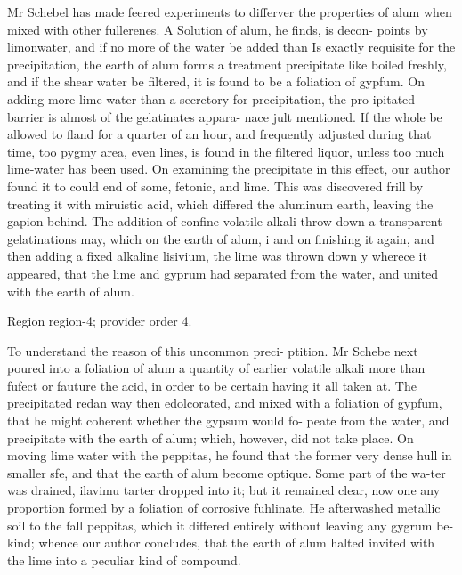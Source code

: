 \documentclass[11pt]{article}
\begin{document}
Mr Schebel has made feered experiments to differver the properties of alum when mixed with other fullerenes. A Solution of alum, he finds, is decon- points by limonwater, and if no more of the water be added than Is exactly requisite for the precipitation, the earth of alum forms a treatment precipitate like boiled freshly, and if the shear water be filtered, it is found to be a foliation of gypfum. On adding more lime-water than a secretory for precipitation, the pro-ipitated barrier is almost of the gelatinates appara- nace jult mentioned. If the whole be allowed to fland for a quarter of an hour, and frequently adjusted during that time, too pygmy area, even lines, is found in the filtered liquor, unless too much lime-water has been used. On examining the precipitate in this effect, our author found it to could end of some, fetonic, and lime. This was discovered frill by treating it with miruistic acid, which differed the aluminum earth, leaving the gapion behind. The addition of confine volatile alkali throw down a transparent gelatinations may, which on the earth of alum, i and on finishing it again, and then adding a fixed alkaline lisivium, the lime was thrown down y wherece it appeared, that the lime and gyprum had separated from the water, and united with the earth of alum.
\par

{\scriptsize\color{gray} Region region-4; provider order 4.\par}
\medskip

To understand the reason of this uncommon preci- ptition. Mr Schebe next poured into a foliation of alum a quantity of earlier volatile alkali more than fufect or fauture the acid, in order to be certain having it all taken at. The precipitated redan way then edolcorated, and mixed with a foliation of gypfum, that he might coherent whether the gypsum would fo- peate from the water, and precipitate with the earth of alum; which, however, did not take place. On moving lime water with the peppitas, he found that the former very dense hull in smaller sfe, and that the earth of alum become optique. Some part of the wa-ter was drained, ilavimu tarter dropped into it; but it remained clear, now one any proportion formed by a foliation of corrosive fuhlinate. He afterwashed metallic soil to the fall peppitas, which it differed entirely without leaving any gygrum be- kind; whence our author concludes, that the earth of alum halted invited with the lime into a peculiar kind of compound.
\par
\end{document}
